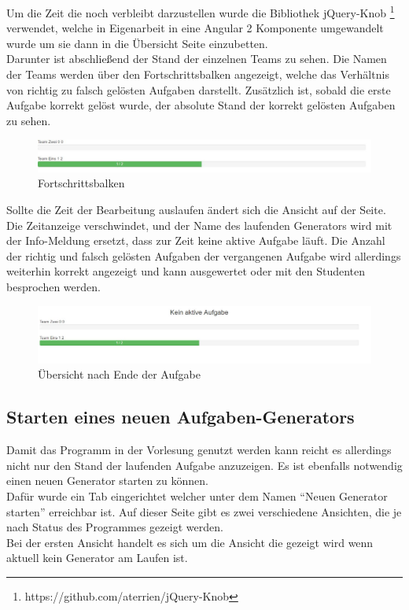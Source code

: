 Um die Zeit die noch verbleibt darzustellen wurde die Bibliothek jQuery-Knob \footnote{https://github.com/aterrien/jQuery-Knob} verwendet, welche in Eigenarbeit in eine Angular 2 Komponente umgewandelt wurde um sie dann in die Übersicht Seite einzubetten. \\

Darunter ist abschließend der Stand der einzelnen Teams zu sehen. Die Namen der Teams werden über den Fortschrittsbalken angezeigt, welche das Verhältnis von richtig zu falsch gelösten Aufgaben darstellt. Zusätzlich ist, sobald die erste Aufgabe korrekt gelöst wurde, der absolute Stand der korrekt gelösten Aufgaben zu sehen. \\

\begin{figure}[htp]     %
\centering
\includegraphics[width=1\textwidth]{bilder/Bars} 
\caption[Fortschrittsbalken]{Fortschrittsbalken}
\end{figure} 

Sollte die Zeit der Bearbeitung auslaufen ändert sich die Ansicht auf der Seite. Die Zeitanzeige verschwindet, und der Name des laufenden Generators wird mit der Info-Meldung ersetzt, dass zur Zeit keine aktive Aufgabe läuft. Die Anzahl der richtig und falsch gelösten Aufgaben der vergangenen Aufgabe wird allerdings weiterhin korrekt angezeigt und kann ausgewertet oder mit den Studenten besprochen werden.

\begin{figure}[htp]     %
\centering
\includegraphics[width=1\textwidth]{bilder/TaskOver} 
\caption[Übersicht nach Ende der Aufgabe]{Übersicht nach Ende der Aufgabe}
\end{figure} 


\subsection{Starten eines neuen Aufgaben-Generators}

Damit das Programm in der Vorlesung genutzt werden kann reicht es allerdings nicht nur den Stand der laufenden Aufgabe anzuzeigen. Es ist ebenfalls notwendig einen neuen Generator starten zu können. \\
Dafür wurde ein Tab eingerichtet welcher unter dem Namen ``Neuen Generator starten'' erreichbar ist.
Auf dieser Seite gibt es zwei verschiedene Ansichten, die je nach Status des Programmes gezeigt werden. \\
Bei der ersten Ansicht handelt es sich um die Ansicht die gezeigt wird wenn aktuell kein Generator am Laufen ist. \\


